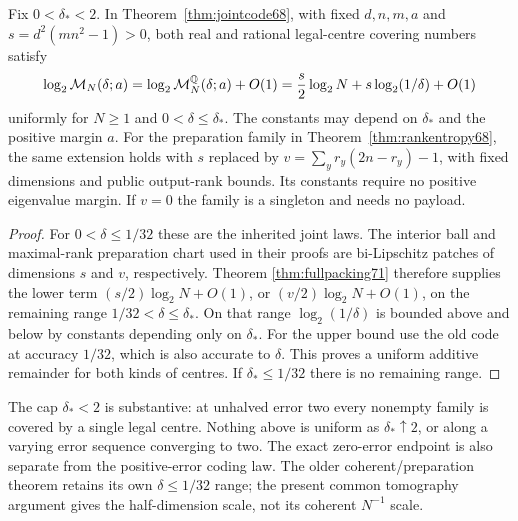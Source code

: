 \begin{corollary}\label{cor:fullrange71}
Fix $0<\delta_*<2$. In Theorem~\ref{thm:jointcode68}, with fixed
$d,n,m,a$ and $s=d^2(mn^2-1)>0$, both real and rational legal-centre
covering numbers satisfy
\begin{equation}\label{eq:interiorfull71}
 \log_2\mathcal M_N(\delta;a)
 =\log_2\mathcal M_N^{\mathbb Q}(\delta;a)+O(1)
 =\frac{s}{2}\log_2N+s\log_2(1/\delta)+O(1)
\end{equation}
uniformly for $N\ge1$ and $0<\delta\le\delta_*$. The constants may
depend on $\delta_*$ and the positive margin $a$.
For the preparation family in Theorem~\ref{thm:rankentropy68}, the
same extension holds with $s$ replaced by
$v=\sum_y r_y(2n-r_y)-1$, with fixed dimensions and public output-rank
bounds. Its constants require no positive eigenvalue margin. If $v=0$
the family is a singleton and needs no payload.
\end{corollary}
\begin{proof}
For $0<\delta\le1/32$ these are the inherited joint laws. The interior
ball and maximal-rank preparation chart used in their proofs are
bi-Lipschitz patches of dimensions $s$ and $v$, respectively. Theorem
\ref{thm:fullpacking71} therefore supplies the lower term
$(s/2)\log_2N+O(1)$, or $(v/2)\log_2N+O(1)$, on the remaining
range $1/32<\delta\le\delta_*$. On that range
$\log_2(1/\delta)$ is bounded above and below by constants depending
only on $\delta_*$. For the upper bound use the old code at accuracy
$1/32$, which is also accurate to $\delta$. This proves a uniform
additive remainder for both kinds of centres. If $\delta_*\le1/32$
there is no remaining range.
\end{proof}
The cap $\delta_*<2$ is substantive: at unhalved error two every
nonempty family is covered by a single legal centre. Nothing above is
uniform as $\delta_*\uparrow2$, or along a varying error sequence
converging to two. The exact zero-error endpoint is also separate from
the positive-error coding law. The older coherent/preparation theorem
retains its own $\delta\le1/32$ range; the present common tomography
argument gives the half-dimension scale, not its coherent $N^{-1}$ scale.
